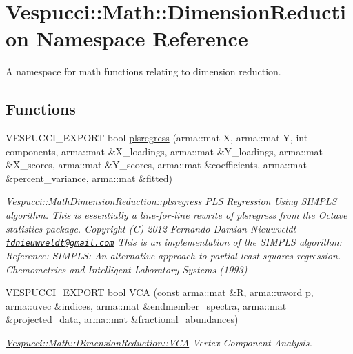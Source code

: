\hypertarget{namespace_vespucci_1_1_math_1_1_dimension_reduction}{}\section{Vespucci\+:\+:Math\+:\+:Dimension\+Reduction Namespace Reference}
\label{namespace_vespucci_1_1_math_1_1_dimension_reduction}


A namespace for math functions relating to dimension reduction.  


\subsection*{Functions}
\begin{DoxyCompactItemize}
\item 
V\+E\+S\+P\+U\+C\+C\+I\+\_\+\+E\+X\+P\+O\+RT bool \hyperlink{namespace_vespucci_1_1_math_1_1_dimension_reduction_a5878e156d2d744ee078a70eeb59f97b3}{plsregress} (arma\+::mat X, arma\+::mat Y, int components, arma\+::mat \&X\+\_\+loadings, arma\+::mat \&Y\+\_\+loadings, arma\+::mat \&X\+\_\+scores, arma\+::mat \&Y\+\_\+scores, arma\+::mat \&coefficients, arma\+::mat \&percent\+\_\+variance, arma\+::mat \&fitted)
\begin{DoxyCompactList}\small\item\em Vespucci\+::\+Math\+Dimension\+Reduction\+::plsregress P\+LS Regression Using S\+I\+M\+P\+LS algorithm. This is essentially a line-\/for-\/line rewrite of plsregress from the Octave statistics package. Copyright (C) 2012 Fernando Damian Nieuwveldt \href{mailto:fdnieuwveldt@gmail.com}{\tt fdnieuwveldt@gmail.\+com} This is an implementation of the S\+I\+M\+P\+LS algorithm\+: Reference\+: S\+I\+M\+P\+LS\+: An alternative approach to partial least squares regression. Chemometrics and Intelligent Laboratory Systems (1993) \end{DoxyCompactList}\item 
V\+E\+S\+P\+U\+C\+C\+I\+\_\+\+E\+X\+P\+O\+RT bool \hyperlink{namespace_vespucci_1_1_math_1_1_dimension_reduction_a2d46d5cccce427efee376aeeea2da058}{V\+CA} (const arma\+::mat \&R, arma\+::uword p, arma\+::uvec \&indices, arma\+::mat \&endmember\+\_\+spectra, arma\+::mat \&projected\+\_\+data, arma\+::mat \&fractional\+\_\+abundances)
\begin{DoxyCompactList}\small\item\em \hyperlink{namespace_vespucci_1_1_math_1_1_dimension_reduction_a2d46d5cccce427efee376aeeea2da058}{Vespucci\+::\+Math\+::\+Dimension\+Reduction\+::\+V\+CA} Vertex Component Analysis. \end{DoxyCompactList}\item 

\end{DoxyCompactItemize}
